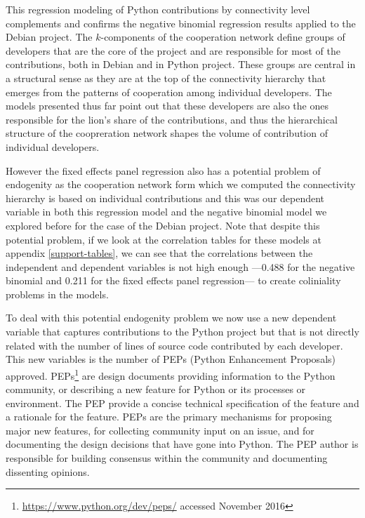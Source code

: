 

This regression modeling of Python contributions by connectivity level complements and confirms the negative binomial regression results applied to the Debian project. The $k$-components of the cooperation network define groups of developers that are the core of the project and are responsible for most of the contributions, both in Debian and in Python project. These groups are central in a structural sense as they are at the top of the connectivity hierarchy that emerges from the patterns of cooperation among individual developers. The models presented thus far point out that these developers are also the ones responsible for the lion's share of the contributions, and thus the hierarchical structure of the coopreration network shapes the volume of contribution of individual developers.

However the fixed effects panel regression also has a potential problem of endogenity as the cooperation network form which we computed the connectivity hierarchy is based on individual contributions and this was our dependent variable in both this regression model and the negative binomial model we explored before for the case of the Debian project. Note that despite this potential problem, if we look at the correlation tables for these models at appendix \ref{support-tables}, we can see that the correlations between the independent and dependent variables is not high enough ---0.488 for the negative binomial and 0.211 for the fixed effects panel regression--- to create coliniality problems in the models.



To deal with this potential endogenity problem we now use a new dependent variable that captures contributions to the Python project but that is not directly related with the number of lines of source code contributed by each developer. This new variables is the number of PEPs (Python Enhancement Proposals) approved. PEPs\footnote{\href{https://www.python.org/dev/peps/}{https://www.python.org/dev/peps/} accessed November 2016} are design documents providing information to the Python community, or describing a new feature for Python or its processes or environment. The PEP provide a concise technical specification of the feature and a rationale for the feature. PEPs are the primary mechanisms for proposing major new features, for collecting community input on an issue, and for documenting the design decisions that have gone into Python. The PEP author is responsible for building consensus within the community and documenting dissenting opinions.

